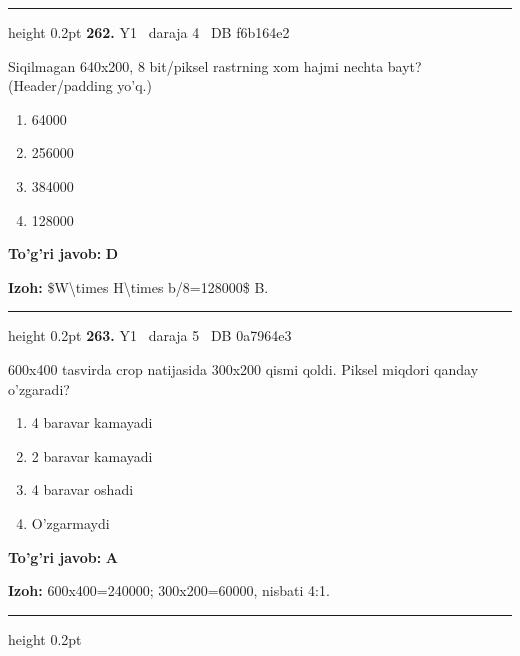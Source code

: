 \documentclass[10pt,a4paper,oneside]{article}
\begin{document}
\vspace{2mm}\hrule height 0.2pt \vspace{4mm}
\hypertarget{q262}{\textbf{\color{ink}262.}}  {\color{muted}\scriptsize Y1 \textbullet\ daraja 4 \textbullet\ DB f6b164e2}
\par
Siqilmagan 640x200, 8 bit/piksel rastrning xom hajmi nechta bayt? (Header/padding yo'q.)
\begin{enumerate}[label=\Alph*),leftmargin=9mm]
\item 64000
\item 256000
\item 384000
\item 128000
\end{enumerate}
\begin{tcolorbox}[enhanced,breakable,colback=teal!4,colframe=teal!45!black,boxrule=0.45pt,arc=1.2mm,left=2.8mm,right=2.8mm,top=2mm,bottom=2mm,before skip=2mm,after skip=2mm]
\textbf{\color{teal}To'g'ri javob:} \textbf{D}
\par\smallskip
\textbf{Izoh:} \$W\textbackslash{}times H\textbackslash{}times b/8=128000\$ B.
\end{tcolorbox}
\vspace{2mm}\hrule height 0.2pt \vspace{4mm}
\hypertarget{q263}{\textbf{\color{ink}263.}}  {\color{muted}\scriptsize Y1 \textbullet\ daraja 5 \textbullet\ DB 0a7964e3}
\par
600x400 tasvirda crop natijasida 300x200 qismi qoldi. Piksel miqdori qanday o'zgaradi?
\begin{enumerate}[label=\Alph*),leftmargin=9mm]
\item 4 baravar kamayadi
\item 2 baravar kamayadi
\item 4 baravar oshadi
\item O'zgarmaydi
\end{enumerate}
\begin{tcolorbox}[enhanced,breakable,colback=teal!4,colframe=teal!45!black,boxrule=0.45pt,arc=1.2mm,left=2.8mm,right=2.8mm,top=2mm,bottom=2mm,before skip=2mm,after skip=2mm]
\textbf{\color{teal}To'g'ri javob:} \textbf{A}
\par\smallskip
\textbf{Izoh:} 600x400=240000; 300x200=60000, nisbati 4:1.
\end{tcolorbox}
\vspace{2mm}\hrule height 0.2pt \vspace{4mm}
\end{document}
